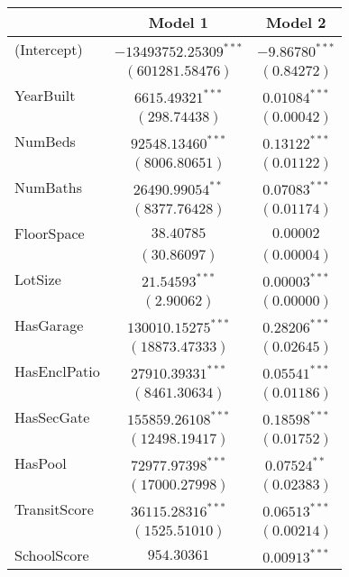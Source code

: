 
\begin{table}
\begin{center}
\begin{tabular}{l c c}
\hline
 & Model 1 & Model 2 \\
\hline
(Intercept)       & $-13493752.25309^{***}$ & $-9.86780^{***}$ \\
                  & $(601281.58476)$        & $(0.84272)$      \\
YearBuilt         & $6615.49321^{***}$      & $0.01084^{***}$  \\
                  & $(298.74438)$           & $(0.00042)$      \\
NumBeds           & $92548.13460^{***}$     & $0.13122^{***}$  \\
                  & $(8006.80651)$          & $(0.01122)$      \\
NumBaths          & $26490.99054^{**}$      & $0.07083^{***}$  \\
                  & $(8377.76428)$          & $(0.01174)$      \\
FloorSpace        & $38.40785$              & $0.00002$        \\
                  & $(30.86097)$            & $(0.00004)$      \\
LotSize           & $21.54593^{***}$        & $0.00003^{***}$  \\
                  & $(2.90062)$             & $(0.00000)$      \\
HasGarage         & $130010.15275^{***}$    & $0.28206^{***}$  \\
                  & $(18873.47333)$         & $(0.02645)$      \\
HasEnclPatio      & $27910.39331^{***}$     & $0.05541^{***}$  \\
                  & $(8461.30634)$          & $(0.01186)$      \\
HasSecGate        & $155859.26108^{***}$    & $0.18598^{***}$  \\
                  & $(12498.19417)$         & $(0.01752)$      \\
HasPool           & $72977.97398^{***}$     & $0.07524^{**}$   \\
                  & $(17000.27998)$         & $(0.02383)$      \\
TransitScore      & $36115.28316^{***}$     & $0.06513^{***}$  \\
                  & $(1525.51010)$          & $(0.00214)$      \\
SchoolScore       & $954.30361$             & $0.00913^{***}$  \\

\end{tabular}
\end{center}
\end{table}
